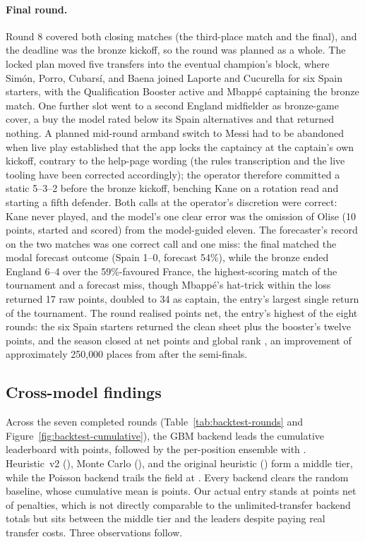 \paragraph{Final round.}
Round 8 covered both closing matches (the third-place match and the
final), and the deadline was the bronze kickoff, so the round was
planned as a whole. The locked plan moved five transfers into the
eventual champion's block, where Sim\'on, Porro, Cubars\'i, and
Baena joined Laporte and Cucurella for six Spain starters, with the
Qualification Booster active and Mbapp\'e captaining the bronze
match. One further slot went to a second England midfielder as
bronze-game cover, a buy the model rated below its Spain
alternatives and that returned nothing. A planned mid-round armband switch to Messi had to be
abandoned when live play established that the app locks the
captaincy at the captain's own kickoff, contrary to the help-page
wording (the rules transcription and the live tooling have been
corrected accordingly); the operator therefore committed a static
5--3--2 before the bronze kickoff, benching Kane on a rotation read
and starting a fifth defender. Both calls at the operator's
discretion were correct: Kane never played, and the model's one
clear error was the omission of Olise (10 points, started and
scored) from the model-guided eleven. The forecaster's record on
the two matches was one correct call and one miss: the final
matched the modal forecast outcome (Spain 1--0, forecast 54\%),
while the bronze ended England 6--4 over
the 59\%-favoured France, the highest-scoring match of the
tournament and a forecast miss, though Mbapp\'e's hat-trick within
the loss returned 17 raw points, doubled to 34 as captain, the
entry's largest single return of the tournament. The round realised \FinalRoundNet{} points net,
the entry's highest of the eight rounds: the six Spain starters
returned the clean sheet plus the booster's twelve points, and the
season closed at \TotalUserActualNet{} net points and global rank
\GlobalRankFinal{}, an improvement of approximately 250{,}000
places from \GlobalRankSF{} after the semi-finals.

\subsection{Cross-model findings}
\label{sec:live-findings}

Across the seven completed rounds (Table~\ref{tab:backtest-rounds}
and Figure~\ref{fig:backtest-cumulative}), the GBM backend leads the
cumulative leaderboard with \TotalGbm{} points, followed by the
per-position ensemble with \TotalEnsemble{}. Heuristic~v2
(\TotalHeuristicVTwo{}), Monte Carlo (\TotalMonteCarlo{}), and the
original heuristic (\TotalHeuristic{}) form a middle tier, while the
Poisson backend trails the field at \TotalPoisson{}. Every backend
clears the random baseline, whose cumulative mean is
\TotalRandomBaselineMean{} points. Our actual entry stands at
\TotalUserActualNet{} points net of penalties, which is not directly
comparable to the unlimited-transfer backend totals but sits between
the middle tier and the leaders despite paying real transfer costs.
Three observations follow.

